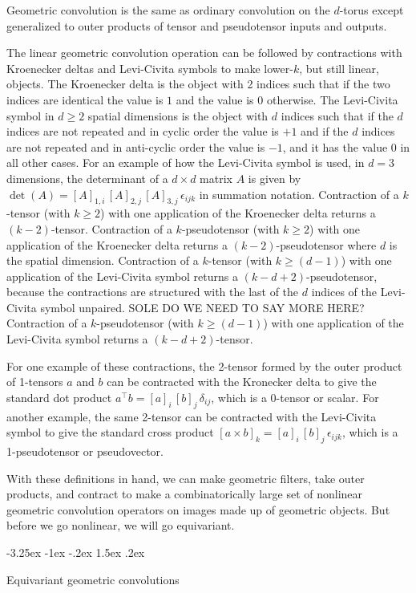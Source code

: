 \documentclass{article}
\makeatletter
\theoremstyle{plain}
\renewcommand\section{\@startsection {section}{1}{\z@}%
  {-3.25ex \@plus -1ex \@minus -.2ex}%
  {1.5ex \@plus .2ex}%
  {\raggedright\normalfont\large\bfseries}}
\makeatother
\begin{document}
Geometric convolution is the same as ordinary convolution on the $d$-torus except generalized to outer products of tensor and pseudotensor inputs and outputs.

The linear geometric convolution operation can be followed by contractions with Kroenecker deltas and Levi-Civita symbols to make lower-$k$, but still linear, objects.
The Kroenecker delta is the object with 2 indices such that if the two indices are identical the value is $1$ and the value is $0$ otherwise.
The Levi-Civita symbol in $d\geq 2$ spatial dimensions is the object with $d$ indices such that if the $d$ indices are not repeated and in cyclic order the value is $+1$ and if the $d$ indices are not repeated and in anti-cyclic order the value is $-1$, and it has the value $0$ in all other cases.
For an example of how the Levi-Civita symbol is used, in $d=3$ dimensions, the determinant of a $d\times d$ matrix $A$ is given by $\det(A) = [A]_{1,i}\,[A]_{2,j}\,[A]_{3,j}\,\epsilon_{ijk}$ in summation notation.
Contraction of a $k$-tensor (with $k\geq 2$) with one application of the Kroenecker delta returns a $(k-2)$-tensor.
Contraction of a $k$-pseudotensor (with $k\geq 2$) with one application of the Kroenecker delta returns a $(k-2)$-pseudotensor where $d$ is the spatial dimension.
Contraction of a $k$-tensor (with $k\geq (d-1)$) with one application of the Levi-Civita symbol returns a $(k-d+2)$-pseudotensor, because the contractions are structured with the last of the $d$ indices of the Levi-Civita symbol unpaired. SOLE DO WE NEED TO SAY MORE HERE?
Contraction of a $k$-pseudotensor (with $k\geq (d-1)$) with one application of the Levi-Civita symbol returns a $(k-d+2)$-tensor.

For one example of these contractions, the 2-tensor formed by the outer product of 1-tensors $a$ and $b$ can be contracted with the Kronecker delta to give the standard dot product $a^\top b = [a]_i\,[b]_j\,\delta_{ij}$, which is a 0-tensor or scalar.
For another example, the same 2-tensor can be contracted with the Levi-Civita symbol to give the standard cross product
$[a\times b]_k = [a]_i\,[b]_j\,\epsilon_{ijk}$, which is a 1-pseudotensor or pseudovector.

With these definitions in hand, we can make geometric filters, take outer products, and contract to make a combinatorically large set of nonlinear geometric convolution operators on images made up of geometric objects.
But before we go nonlinear, we will go equivariant.

\section{Equivariant geometric convolutions}\label{sec:equivariant}
\end{document}
